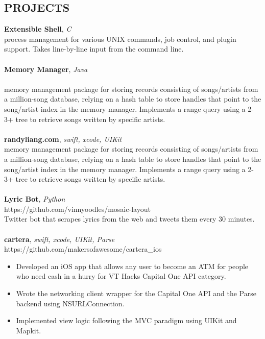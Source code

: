 \documentclass[line,margin]{res}
\begin{document}
\begin{resume}
	\section{PROJECTS}
	\textbf{Extensible Shell}, {\sl C}\\ process management for various UNIX commands, job control, and plugin support. Takes line-by-line input from the command line.\\\\
	\textbf{Memory Manager}, {\sl Java}\\ \href{https://github.com/kidcharlemagne/DSA/tree/master/2-3%2B%20Tree} \\memory management package for storing records consisting of songs/artists from a million-song database, relying on a hash table to store handles that point to the song/artist index in the memory manager. Implements a range query using a 2-3+ tree to retrieve songs written by specific artists.\\\\
	\textbf{randyliang.com}, {\sl swift, xcode, UIKit}\\ memory management package for storing records consisting of songs/artists from a million-song database, relying on a hash table to store handles that point to the song/artist index in the memory manager. Implements a range query using a 2-3+ tree to retrieve songs written by specific artists.\\\\
	\textbf{Lyric Bot}, {\sl Python}\\ https://github.com/vinnyoodles/mosaic-layout\\Twitter bot that scrapes lyrics from the web and tweets them every 30 minutes.\\\\
	\textbf{cartera}, {\sl swift, xcode, UIKit, Parse}\\ https://github.com/makersofawesome/cartera\_ios\\\begin{itemize} \itemsep 1pt
	\item Developed an iOS app that allows any user to become an ATM for people who need cash in a hurry for VT Hacks Capital One API category. 
	\item Wrote the networking client wrapper for the Capital One API and the Parse backend using NSURLConnection. 
	\item Implemented view logic following the MVC paradigm using UIKit and Mapkit.
	\end{itemize}
	          
	\ 
\end{resume}
\end{document}
